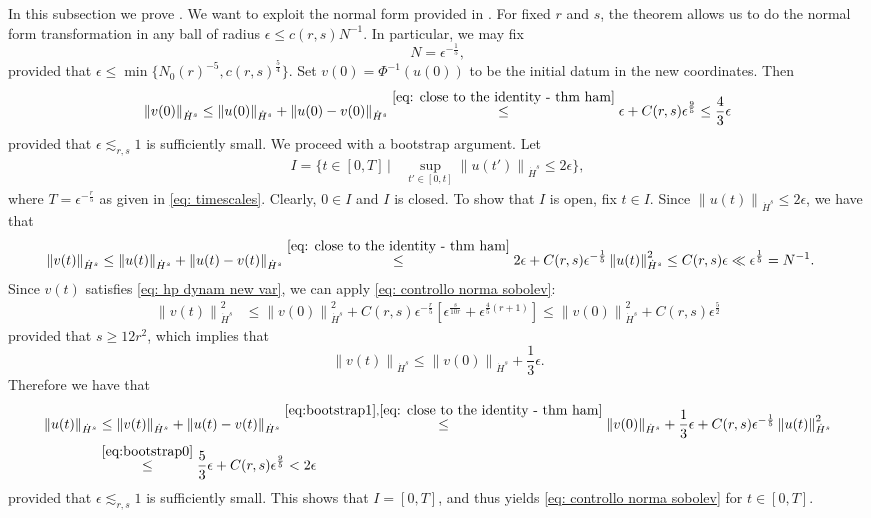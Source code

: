 \documentclass[a4paper,10pt,reqno]{article}
\theoremstyle{definition}
\theoremstyle{plain}
\theoremstyle{plain}
\theoremstyle{definition}
\theoremstyle{plain}
\theoremstyle{plain}
\theoremstyle{plain}
\theoremstyle{definition}
\theoremstyle{definition}
\newcommand{\norm}[1]{\left\lVert #1 \right\rVert}
\begin{document}
In this subsection we prove .
We want to exploit the normal form provided in . 
For fixed $r$ and $s$, the theorem allows us to do the normal form transformation in any ball of radius $\epsilon\leq c(r,s) N^{-1}$. In particular, we may fix
\begin{equation}
N = \epsilon^{-\frac{1}{5}},
\label{eq: choice of N}
\end{equation}
provided that $\epsilon\leq \min\{N_0(r)^{-5}, c(r,s)^{\frac54}\}$.
Set $v(0) = \Phi^{-1}(u(0))$ to be the initial datum in the new coordinates. Then
\begin{equation}\label{eq:bootstrap0}
\norm{v(0)}_{\dot{H}^s} \le \norm{u(0)}_{\dot{H}^s} + \norm{u(0)-v(0)}_{\dot{H}^s} \stackrel{\eqref{eq: close to the identity - thm ham}}{\le} \epsilon + C(r,s) \epsilon^{\frac{9}{5}} \le \frac{4}{3} \epsilon
\end{equation}
provided that $\epsilon \lesssim_{r,s} 1$ is sufficiently small.
We proceed with a bootstrap argument.
Let
\[
\begin{split}
I = \bigg \{ t \in [0,T] \, | \, &\sup_{t' \in [0,t]} \norm{u(t')}_{\dot{H}^s} \le 2 \epsilon \bigg \},
\end{split}
\]
where $T=\epsilon^{-\frac{r}{5}}$ as given in \eqref{eq: timescales}. Clearly, $0 \in I$ and $I$ is closed. To show that $I$ is open, fix $t \in I$.
Since $\norm{u(t)}_{\dot{H}^s} \le 2 \epsilon$, we have that
\[
\begin{split}
\norm{v(t)}_{\dot{H}^s} &\le \norm{u(t)}_{\dot{H}^s} + \norm{u(t)-v(t)}_{\dot{H}^s} \stackrel{\eqref{eq: close to the identity - thm ham}}{\le} 2 \epsilon + C(r,s) \epsilon^{-\frac{1}{5}} \norm{u(t)}_{\dot{H}^s}^2 \le C(r,s) \epsilon \ll \epsilon^{\frac{1}{5}} = N^{-1}.
\end{split}
\]
Since $v(t)$ satisfies \eqref{eq: hp dynam new var}, we can apply \eqref{eq: controllo norma sobolev}:
\[
\begin{split}
\norm{v(t)}_{\dot{H}^s}^2 &\le \norm{v(0)}_{\dot{H}^s}^2 + C(r,s) \epsilon^{-\frac{r}{5}} \left [ \epsilon^{\frac{s}{10r}} + \epsilon^{\frac{4}{5}(r+1)} \right] \le \norm{v(0)}_{\dot{H}^s}^2 + C(r,s)\epsilon^{\frac52}
\end{split}
\]
provided that $s \ge 12 r^2$, which implies that
\begin{equation}\label{eq:bootstrap1}
\norm{v(t)}_{\dot{H}^s} \le \norm{v(0)}_{\dot{H}^s} + \frac{1}{3}\epsilon.
\end{equation}
Therefore we have that
\[
\begin{split}
\norm{u(t)}_{\dot{H}^s} & \le \norm{v(t)}_{\dot{H}^s} + \norm{u(t)-v(t)}_{\dot{H}^s} \stackrel{\eqref{eq:bootstrap1},\eqref{eq: close to the identity - thm ham}}{\le} \norm{v(0)}_{\dot{H}^s} + \frac{1}{3}\epsilon + C(r,s) \epsilon^{-\frac{1}{5}} \norm{u(t)}_{\dot{H}^s}^2 \\
& \stackrel{\eqref{eq:bootstrap0}}{\le} \frac{5}{3}\epsilon + C(r,s) \epsilon^{\frac{9}{5}} < 2 \epsilon
\end{split}
\]
provided that $\epsilon \lesssim_{r,s} 1$ is sufficiently small.
This shows that $I=[0,T]$, and thus yields \eqref{eq: controllo norma sobolev} for $t \in [0,T]$.
\end{document}
